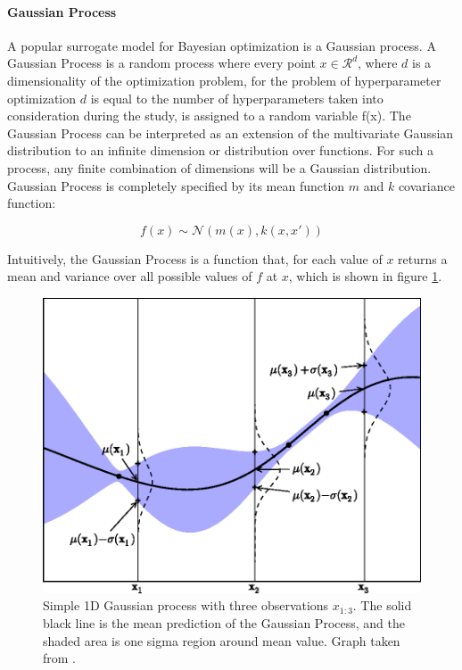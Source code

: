 \paragraph{Gaussian Process} \mbox{}

A popular surrogate model for Bayesian optimization is a Gaussian process. 
A Gaussian Process is a random process where every point $x \in \mathcal{R}^{d}$, where $d$ is a dimensionality of the optimization problem, for the problem of hyperparameter optimization $d$ is equal to the number of hyperparameters taken into consideration during the study, 
is assigned to a random variable f(x). The Gaussian Process can be interpreted as an extension of the multivariate Gaussian distribution to an infinite dimension or distribution over functions. For such a process, any finite combination of dimensions will be a Gaussian distribution. Gaussian Process is completely specified by its mean function $m$ and $k$ covariance function: 

\begin{equation}
    f(x) \sim  \mathcal{N} \left( m(x), k(x,x')  \right)
\end{equation}

Intuitively, the Gaussian Process is a function that, for each value of $x$ returns a mean and variance over all possible values of $f$ at $x$, which is shown in figure \ref{fig:GP}.  

\begin{figure}
\centering
\includegraphics[scale=0.7]{figures/GaussianProcess.png}
\caption{ Simple 1D Gaussian process with three observations $x_{1:3}$. The solid black line is the mean prediction of the Gaussian Process, and the shaded area is one sigma region around mean value.   
Graph taken from \cite{BayesianOpt}.
\label{fig:GP}}
\end{figure}

